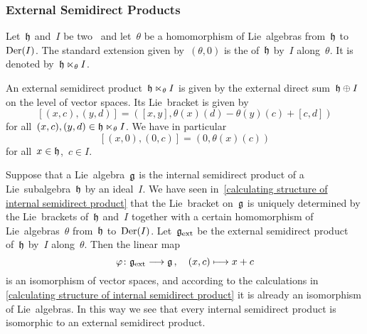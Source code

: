 \subsubsection{External Semidirect Products}

\begin{definition}
  Let~$\mathfrak{h}$ and~$I$ be two~\liealgebras{$\kf$} and let~$\theta$ be a homomorphism of Lie~algebras from~$\mathfrak{h}$ to~$\operatorname{Der}(I)$.
  The standard extension given by~$(\theta, 0)$ is the  of~$\mathfrak{h}$ by~$I$ along~$\theta$.
  It is denoted by~$\mathfrak{h} \ltimes_\theta I$.
\end{definition}


\begin{remark}
  An external semidirect product~$\mathfrak{h} \ltimes_\theta I$ is given by the external direct sum~$\mathfrak{h} \oplus I$ on the level of vector spaces.
  Its Lie~bracket is given by
  \[
    [ (x,c), (y,d) ]
    =
    ( [x,y], \theta(x)(d) - \theta(y)(c) + [c,d] )
  \]
  for all~$(x,c), (y,d) \in \mathfrak{h} \ltimes_\theta I$.
  We have in particular
  \[
    [(x,0), (0,c)]
    =
    ( 0, \theta(x)(c) )
  \]
  for all~$x \in \mathfrak{h}$,~$c \in I$.
\end{remark}


\begin{fluff}
  \label{internal semidirect product is also external}
  Suppose that a Lie~algebra~$\mathfrak{g}$ is the internal semidirect product of a Lie~subalgebra~$\mathfrak{h}$ by an ideal~$I$.
  We have seen in~\cref{calculating structure of internal semidirect product} that the Lie~bracket on~$\mathfrak{g}$ is uniquely determined by the Lie~brackets of~$\mathfrak{h}$ and~$I$ together with a certain homomorphism of Lie~algebras~$\theta$ from~$\mathfrak{h}$ to~$\operatorname{Der}(I)$.
  Let~$\mathfrak{g}_{\mathrm{ext}}$ be the external semidirect product of~$\mathfrak{h}$ by~$I$ along~$\theta$.
  Then the linear map
  \[
    \varphi
    \colon
    \glie_{\ext}
    \to
    \glie \,,
    \quad
    (x, c)
    \mapsto
    x + c
  \]
  is an isomorphism of vector spaces, and according to the calculations in \cref{calculating structure of internal semidirect product} it is already an isomorphism of Lie~algebras.
  In this way we see that every internal semidirect product is isomorphic to an external semidirect product.
\end{fluff}


